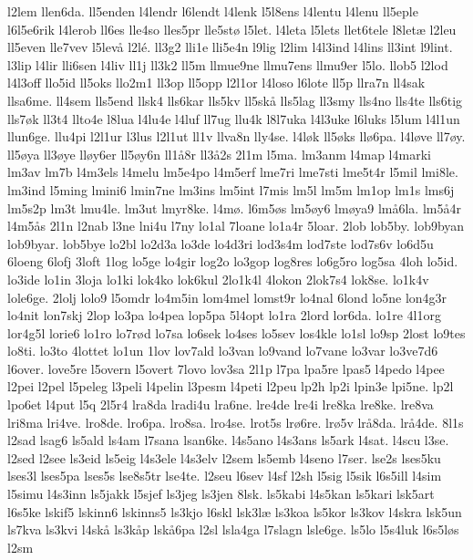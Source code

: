 {l2lem
llen6da.
ll5enden
l4lendr
l6lendt
l4lenk
l5l8ens
l4lentu
l4lenu
ll5eple
l6l5e6rik
l4lerob
ll6es
lle4so
lles5pr
lle5st^^f8
l5let.
l4leta
l5lets
llet6tele
l8let^^e6
l2leu
ll5even
lle7vev
l5lev^^e5
l2l^^e9.
ll3g2
lli1e
lli5e4n
l9lig
l2lim
l4l3ind
l4lins
ll3int
l9lint.
l3lip
l4lir
lli6sen
l4liv
ll1j
ll3k2
ll5m
llmue9ne
llmu7ens
llmu9er
l5lo.
llob5
l2lod
l4l3off
llo5id
ll5oks
llo2m1
ll3op
ll5opp
l2l1or
l4loso
l6lote
ll5p
llra7n
ll4sak
llsa6me.
ll4sem
lls5end
llsk4
lls6kar
lls5kv
ll5sk^^e5
lls5lag
ll3smy
lls4no
lls4te
lls6tig
lls7^^f8k
ll3t4
llto4e
l8lua
l4lu4e
l4luf
ll7ug
llu4k
l8l7uka
l4l3uke
l6luks
l5lum
l4l1un
llun6ge.
llu4pi
l2l1ur
l3lus
l2l1ut
ll1v
llva8n
lly4se.
l4l^^f8k
ll5^^f8ks
ll^^f86pa.
l4l^^f8ve
ll7^^f8y.
ll5^^f8ya
ll3^^f8ye
ll^^f8y6er
ll5^^f8y6n
ll1^^e58r
ll3^^e52s
2l1m
l5ma.
lm3anm
l4map
l4marki
lm3av
lm7b
l4m3els
l4melu
lm5e4po
l4m5erf
lme7ri
lme7sti
lme5t4r
l5mil
lmi8le.
lm3ind
l5ming
lmini6
lmin7ne
lm3ins
lm5int
l7mis
lm5l
lm5m
lm1op
lm1s
lms6j
lm5s2p
lm3t
lmu4le.
lm3ut
lmyr8ke.
l4m^^f8.
l6m5^^f8s
lm5^^f8y6
lm^^f8ya9
lm^^e56la.
lm5^^e54r
l4m5^^e5s
2l1n
l2nab
l3ne
lni4u
l7ny
lo1al
7loane
lo1a4r
5loar.
2lob
lob5by.
lob9byan
lob9byar.
lob5bye
lo2bl
lo2d3a
lo3de
lo4d3ri
lod3s4m
lod7ste
lod7s6v
lo6d5u
6loeng
6lofj
3loft
1log
lo5ge
lo4gir
log2o
lo3gop
log8res
lo6g5ro
log5sa
4loh
lo5id.
lo3ide
lo1in
3loja
lo1ki
lok4ko
lok6kul
2lo1k4l
4lokon
2lok7s4
lok8se.
lo1k4v
lole6ge.
2lolj
lolo9
l5omdr
lo4m5in
lom4mel
lomst9r
lo4nal
6lond
lo5ne
lon4g3r
lo4nit
lon7skj
2lop
lo3pa
lo4pea
lop5pa
5l4opt
lo1ra
2lord
lor6da.
lo1re
4l1org
lor4g5l
lorie6
lo1ro
lo7r^^f8d
lo7sa
lo6sek
lo4ses
lo5sev
los4kle
lo1sl
lo9sp
2lost
lo9tes
lo8ti.
lo3to
4lottet
lo1un
1lov
lov7ald
lo3van
lo9vand
lo7vane
lo3var
lo3ve7d6
l6over.
love5re
l5overn
l5overt
7lovo
lov3sa
2l1p
l7pa
lpa5re
lpas5
l4pedo
l4pee
l2pei
l2pel
l5peleg
l3peli
l4pelin
l3pesm
l4peti
l2peu
lp2h
lp2i
lpin3e
lpi5ne.
lp2l
lpo6et
l4put
l5q
2l5r4
lra8da
lradi4u
lra6ne.
lre4de
lre4i
lre8ka
lre8ke.
lre8va
lri8ma
lri4ve.
lro8de.
lro6pa.
lro8sa.
lro4se.
lrot5s
lr^^f86re.
lr^^f85v
lr^^e58da.
lr^^e54de.
8l1s
l2sad
lsag6
ls5ald
ls4am
l7sana
lsan6ke.
l4s5ano
l4s3ans
ls5ark
l4sat.
l4scu
l3se.
l2sed
l2see
ls3eid
ls5eig
l4s3ele
l4s3elv
l2sem
ls5emb
l4seno
l7ser.
lse2s
lses5ku
lses3l
lses5pa
lses5s
lse8s5tr
lse4te.
l2seu
l6sev
l4sf
l2sh
l5sig
l5sik
l6s5ill
l4sim
l5simu
l4s3inn
ls5jakk
l5sjef
ls3jeg
ls3jen
8lsk.
ls5kabi
l4s5kan
ls5kari
lsk5art
l6s5ke
lskif5
lskinn6
lskinns5
ls3kjo
l6skl
lsk3l^^e6
ls3koa
ls5kor
ls3kov
l4skra
lsk5un
ls7kva
ls3kvi
l4sk^^e5
ls3k^^e5p
lsk^^e56pa
l2sl
lsla4ga
l7slagn
lsle6ge.
ls5lo
l5s4luk
l6s5l^^f8s
l2sm
}
